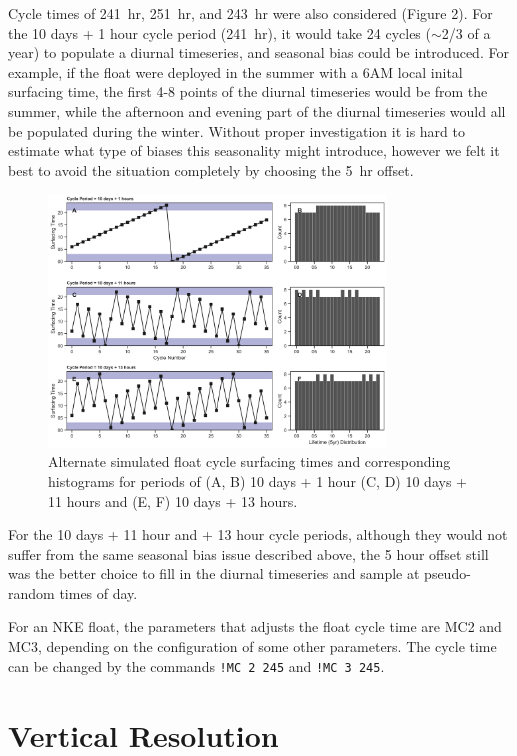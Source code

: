 \documentclass[11pt]{article}
\begin{document}
    Cycle times of 241~hr, 251~hr, and 243~hr were also considered (Figure 2). For the 10 days + 1 hour cycle period (241~hr), it would take 24 cycles ($\sim$2/3 of a year) to populate a diurnal timeseries, and seasonal bias could be introduced. For example, if the float were deployed in the summer with a 6AM local inital surfacing time, the first 4-8 points of the diurnal timeseries would be from the summer, while the afternoon and evening part of the diurnal timeseries would all be populated during the winter. Without proper investigation it is hard to estimate what type of biases this seasonality might introduce, however we felt it best to avoid the situation completely by choosing the 5~hr offset. 

    \begin{figure}[ht]
        \centering
        \includegraphics[width=0.8\textwidth]{../figures/profile_time_of_day_near12hr_1yr_updated.png}
        \caption{Alternate simulated float cycle surfacing times and corresponding histograms for periods of (A, B) 10 days + 1 hour (C, D) 10 days + 11 hours and (E, F) 10 days + 13 hours.}
    \end{figure}

    For the 10 days + 11 hour and + 13 hour cycle periods, although they would not suffer from the same seasonal bias issue described above, the 5 hour offset still was the better choice to fill in the diurnal timeseries and sample at pseudo-random times of day.

    For an NKE float, the parameters that adjusts the float cycle time are MC2 and MC3, depending on the configuration of some other parameters. The cycle time can be changed by the commands \verb|!MC 2 245| and \verb|!MC 3 245|. 

    \section{Vertical Resolution}
\end{document}
